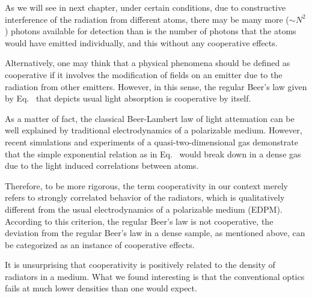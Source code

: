 
As we will see in next chapter, under certain conditions, due to constructive interference of the radiation from different atoms, there may be many more ($\sim N^2$) photons available for detection than is the number of photons that the atoms would have emitted individually, and this without any cooperative effects.
 

Alternatively, one may think that a physical phenomena should be defined as cooperative if it involves the modification of fields on an emitter due to the radiation from other emitters. However, in this sense, the regular Beer's law given by Eq.~ that depicts usual light absorption is cooperative by itself.

As a matter of fact, the classical Beer-Lambert law of light attenuation can be well explained by traditional electrodynamics of a polarizable medium. However, recent simulations and experiments of a quasi-two-dimensional gas demonstrate that the simple exponential relation as in Eq.~ would break down in a dense gas due to the light induced correlations between atoms. 

Therefore, to be more rigorous, the term cooperativity in our context merely refers to strongly correlated behavior of the radiators, which is qualitatively different from the usual electrodynamics of a polarizable medium (EDPM). According to this criterion, the regular Beer's law is not cooperative, the deviation from the regular Beer's law in a dense sample, as mentioned above, can be categorized as an instance of cooperative effects.


It is unsurprising that cooperativity is positively related to the density of radiators in a medium. What we found interesting is that the conventional optics fails at much lower densities than one would expect. 
